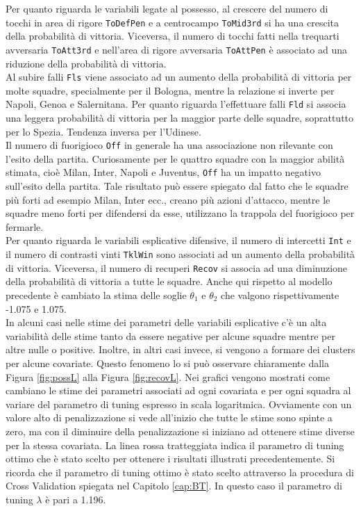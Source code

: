 Per quanto riguarda le variabili legate al possesso, al crescere del numero di tocchi in area di rigore \texttt{ToDefPen} e a centrocampo \texttt{ToMid3rd} si ha una crescita della probabilità di vittoria. Viceversa, il numero di tocchi fatti nella trequarti avversaria \texttt{ToAtt3rd} e nell'area di rigore avversaria \texttt{ToAttPen} è associato ad una riduzione della probabilità di vittoria.\\
Al subire falli \texttt{Fls} viene associato ad un aumento della probabilità di vittoria per molte squadre, specialmente per il Bologna, mentre la relazione si inverte per Napoli, Genoa e Salernitana. Per quanto riguarda l'effettuare falli \texttt{Fld} si associa una leggera probabilità di vittoria per la maggior parte delle squadre, soprattutto per lo Spezia. Tendenza inversa per l'Udinese.\\
Il numero di fuorigioco \texttt{Off} in generale ha una associazione non rilevante con l'esito della partita. Curiosamente per le quattro squadre con la maggior abilità stimata, cioè Milan, Inter, Napoli e Juventus, \texttt{Off} ha un impatto negativo sull'esito della partita. Tale risultato può essere spiegato dal fatto che le squadre più forti ad esempio Milan, Inter ecc., creano più azioni d'attacco, mentre le squadre meno forti per difendersi da esse, utilizzano la trappola del fuorigioco per fermarle.\\
Per quanto riguarda le variabili esplicative difensive, il numero di intercetti \texttt{Int} e il numero di contrasti vinti \texttt{TklWin} sono associati ad un aumento della probabilità di vittoria. Viceversa, il numero di recuperi \texttt{Recov} si associa ad una diminuzione della probabilità di vittoria a tutte le squadre. Anche qui rispetto al modello precedente è cambiato la stima delle soglie $\theta_1$ e $\theta_2$ che valgono rispettivamente -1.075 e 1.075.\\
In alcuni casi nelle stime dei parametri delle variabili esplicative c'è un alta variabilità delle stime tanto da essere negative per alcune squadre mentre per altre nulle o positive. Inoltre, in altri casi invece, si vengono a formare dei clusters per alcune covariate. Questo fenomeno lo si può osservare chiaramente dalla Figura \ref{fig:possL} alla Figura \ref{fig:recovL}. Nei grafici vengono mostrati come cambiano le stime dei parametri associati ad ogni covariata e per ogni squadra al variare del parametro di tuning espresso in scala logaritmica. Ovviamente con un valore alto di penalizzazione si vede all'inizio che tutte le stime sono spinte a zero, ma con il diminuire della penalizzazione si iniziano ad ottenere stime diverse per la stessa covariata. La linea rossa tratteggiata indica il parametro di tuning ottimo che è stato scelto per ottenere i risultati illustrati precedentemente. Si ricorda che il parametro di tuning ottimo è stato scelto attraverso la procedura di Cross Validation spiegata nel Capitolo \ref{cap:BT}. In questo caso il parametro di tuning $\lambda$ è pari a 1.196.\\

